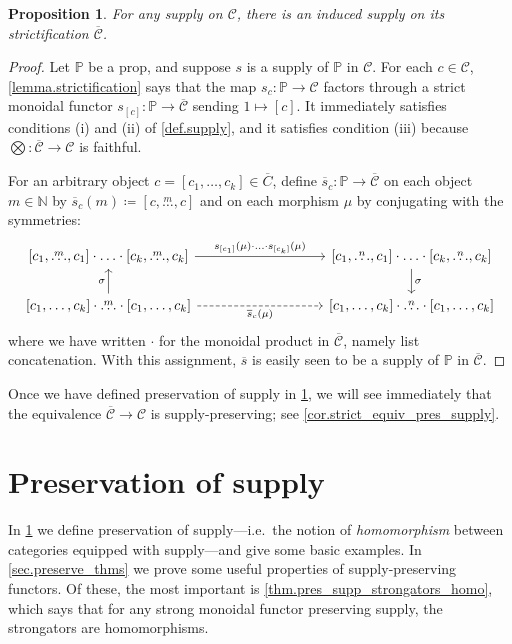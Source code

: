 \documentclass[11pt, oneside, article]{memoir}
\theoremstyle{plain}
\newtheorem{proposition}[theorem]{Proposition}
\theoremstyle{definition}
\theoremstyle{remark}
\newcommand{\cat}[1]{\mathcal{#1}}%
\newcommand{\strict}[1]{\overline{#1}}
\newcommand{\nn}{\mathbb{N}}
\newcommand{\pp}{\mathbb{P}}
\newcommand{\Ldots}[1]{\overset{#1}{\ldots}}
\begin{document}
\begin{proposition}\label{thm.supply_strictification}
For any supply on $\cat{C}$, there is an induced supply on its strictification $\strict{\cat{C}}$.
\end{proposition}
\begin{proof}
Let $\pp$ be a prop, and suppose $s$ is a supply of $\pp$ in $\cat{C}$. For each $c\in\cat{C}$, \cref{lemma.strictification} says that the map $s_c\colon\pp\to\cat{C}$ factors through a strict monoidal functor $s_{[c]}\colon\pp\to\strict{\cat{C}}$ sending $1\mapsto[c]$. It immediately satisfies conditions (i) and (ii) of \cref{def.supply}, and it satisfies condition (iii) because $\bigotimes\colon\strict{\cat{C}}\to\cat{C}$ is faithful.

For an arbitrary object $c=[c_1,\ldots,c_k]\in\strict{C}$, define $\strict{s}_c\colon\pp\to\strict{\cat{C}}$ on each object $m\in\nn$ by $\strict{s}_c(m)\coloneqq[c,\Ldots{m},c]$ and on each morphism $\mu$ by conjugating with the symmetries:
\[
\begin{tikzcd}[column sep=90pt]
	{[c_1,\Ldots{m},c_1] \cdot \ldots \cdot [c_k,\Ldots{m}, c_k]}
		\ar[r, "{s_{[c_1]}(\mu) \cdot \ldots \cdot s_{[c_k]}(\mu)}"]&
	{[c_1,\Ldots{n},c_1] \cdot \ldots\cdot [c_k,\Ldots{n}, c_k]}
		\ar[d, "\sigma"]\\
	{[c_1,\ldots, c_k] \cdot \Ldots{m} \cdot [c_1,\ldots,c_k]}
		\ar[u, "\sigma"]\ar[r, dashed, "\strict{s}_c(\mu)"']&
	{[c_1,\ldots, c_k] \cdot \Ldots{n} \cdot [c_1,\ldots,c_k]}
\end{tikzcd}
\]
where we have written $\cdot$ for the monoidal product in $\strict{\cat{C}}$, namely list concatenation.
With this assignment, $\strict{s}$ is easily seen to be a supply of $\pp$ in $\strict{\cat{C}}$.
\end{proof}
Once we have defined preservation of supply in \cref{sec.pres_supply}, we will see immediately that the equivalence $\strict{\cat{C}}\to\cat{C}$ is supply-preserving; see \cref{cor.strict_equiv_pres_supply}.

\chapter{Preservation of supply}\label{sec.pres_supply}

In \cref{sec.pres_supply} we define preservation of supply---i.e.\ the notion of \emph{homomorphism} between categories equipped with supply---and give some basic examples. In \cref{sec.preserve_thms} we prove some useful properties of supply-preserving functors. Of these, the most important is \cref{thm.pres_supp_strongators_homo}, which says that for any strong monoidal functor preserving supply, the strongators are homomorphisms.
\end{document}
